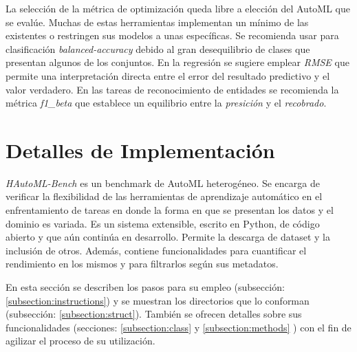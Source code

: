 La selección de la métrica de optimización queda libre a elección del AutoML que se evalúe. Muchas de estas herramientas implementan un mínimo de las existentes
o restringen sus modelos a unas específicas. Se recomienda usar para clasificación \textit{balanced-accuracy} debido al gran desequilibrio de clases que presentan 
algunos de los conjuntos. En la regresión se sugiere emplear \textit{RMSE} que permite una interpretación directa entre el error del resultado predictivo y el 
valor verdadero. En las tareas de reconocimiento de entidades se recomienda la métrica \textit{f1\_beta} que establece un equilibrio entre la \textit{presición} y el 
\textit{recobrado}.

\section{Detalles de Implementación}\label{section:Implementation}
\textit{HAutoML-Bench} es un benchmark de AutoML heterogéneo. Se encarga de verificar la flexibilidad de las herramientas de aprendizaje automático en el enfrentamiento
de tareas en donde la forma en que se presentan los datos y el dominio es variada. Es un sistema extensible, escrito en Python, de código abierto y que aún continúa en 
desarrollo. Permite la descarga de dataset y la inclusión de otros. Además, contiene funcionalidades para cuantificar el rendimiento en los mismos y para filtrarlos 
según sus metadatos. 

En esta sección se describen los pasos para su empleo (subsección: \ref{subsection:instructions}) y se muestran los directorios que lo conforman 
(subsección: \ref{subsection:struct}). También se ofrecen detalles sobre sus funcionalidades (secciones: \ref{subsection:class} y \ref{subsection:methods} )
con el fin de agilizar el proceso de su utilización.

